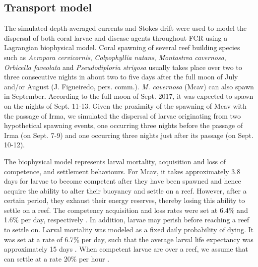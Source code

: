 \documentclass[fleqn,10pt]{wlscirep}
\begin{document}
\subsection{Transport model}
The simulated depth-averaged currents and Stokes drift were used to model the dispersal of both coral larvae and disease agents throughout FCR using a Lagrangian biophysical model. Coral spawning of several reef building species such as {\it Acropora cervicornis}, {\it Colpophyllia natans}, {\it Montastrea cavernosa}, {\it Orbicella faveolata} and {\it Pseudodiploria strigosa} usually takes place over two to three consecutive nights in about two to five days after the full moon of July and/or August (J. Figueiredo, pers. comm.). {\it M. cavernosa} (Mcav) can also spawn in September. According to the full moon of Sept. 2017, it was expected to spawn on the nights of Sept. 11-13. Given the proximity of the spawning of Mcav with the passage of Irma, we simulated the dispersal of larvae originating from two hypothetical spawning events, one occurring three nights before the passage of Irma (on Sept. 7-9) and one occurring three nights just after its passage (on Sept. 10-12).

The biophysical model represents larval mortality, acquisition and loss of competence, and settlement behaviours. For Mcav, it takes approximately 3.8 days for larvae to become competent after they have been spawned and hence acquire the ability to alter their buoyancy and settle on a reef. However, after a certain period, they exhaust their energy reserves, thereby losing this ability to settle on a reef. The competency acquisition and loss rates were set at 6.4\% and 1.6\% per day, respectively \citep{Kuba2016}. In addition, larvae may perish before reaching a reef to settle on. Larval mortality was modeled as a fixed daily probability of dying. It was set at a rate of 6.7\% per day, such that the average larval life expectancy was approximately 15 days \citep{Kuba2016}. When competent larvae are over a reef, we assume that can settle at a rate 20\% per hour \citep{king2023larval}.
\end{document}
